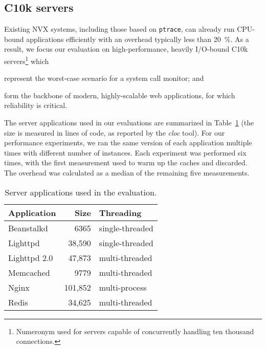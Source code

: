 \subsection{C10k servers}
\label{sec:c10k}

Existing NVX systems, including those based on \lstinline`ptrace`, can
already run CPU-bound applications efficiently with an overhead
typically less than \SI{20}{\percent}.  As a result, we focus our evaluation on
high-performance, heavily I/O-bound C10k servers\footnote{Numeronym used
  for servers capable of concurrently handling ten thousand connections.}
  which%
\begin{inparaenum}[(1)]
\item represent the worst-case scenario for a system call monitor; and
\item form the backbone of modern, highly-scalable web applications,
  for which reliability is critical.
\end{inparaenum}

The \nservers server applications used in our evaluations are
summarized in Table~\ref{tbl:apps} (the size is measured in lines of
code, as reported by the \emph{cloc} tool). For our performance experiments, we
ran the same version of each application multiple times with different number
of instances. 
Each experiment was performed six times, with
the first measurement used to warm up the caches and discarded.  The overhead
was calculated as a median of the remaining five measurements.

\begin{table}
\begin{center}
\begin{tabular}{lrl}
  \hline
  \textbf{Application} & \textbf{Size} & \textbf{Threading} \\
  \hline
  Beanstalkd & 6365 & single-threaded \\
  Lighttpd & 38,590 & single-threaded\\
  Lighttpd 2.0 & 47,873 & multi-threaded\\
  Memcached & 9779 &  multi-threaded\\
  Nginx & 101,852 & multi-process\\
  Redis & 34,625 & multi-threaded\\
\end{tabular}
\end{center}
\caption{Server applications used in the evaluation.}
\label{tbl:apps}
\end{table}

